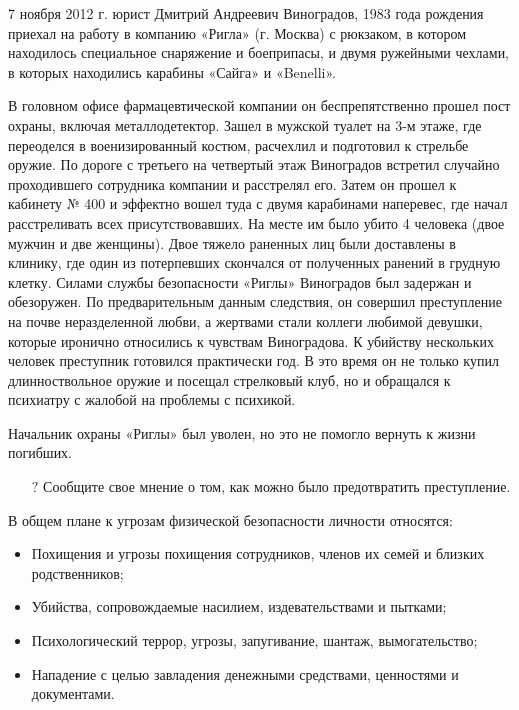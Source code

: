 \documentclass[a4paper,12pt,fleqn]{article} %
\begin{document}
\begin{tcolorbox}[colback=blue!55!red!5!,colframe=blue!55!red,enforce breakable,%
	pad at break=1mm, title=Кейс 28. Действия обиженного сотрудника]
	
7 ноября 2012 г. юрист Дмитрий Андреевич Виноградов, 1983 года рождения приехал на работу в компанию «Ригла» (г. Москва) с рюкзаком, в котором находилось специальное снаряжение и боеприпасы, и двумя ружейными чехлами, в которых находились карабины «Сайга» и «Benelli».

В головном офисе фармацевтической компании он беспрепятственно прошел пост охраны, включая металлодетектор. Зашел в мужской туалет на 3-м этаже, где переоделся в военизированный костюм, расчехлил и подготовил к стрельбе оружие. По дороге с третьего на четвертый этаж Виноградов встретил случайно проходившего сотрудника компании и расстрелял его. Затем он прошел к кабинету № 400 и эффектно вошел туда с двумя карабинами наперевес, где начал расстреливать всех присутствовавших. На месте им было убито 4 человека (двое мужчин и две женщины). Двое тяжело раненных лиц были доставлены в клинику, где один из потерпевших скончался от полученных ранений в грудную клетку. Силами службы безопасности «Риглы» Виноградов был задержан и обезоружен. По предварительным данным следствия, он совершил преступление на почве неразделенной любви, а жертвами стали коллеги любимой девушки, которые иронично относились к чувствам Виноградова. К убийству нескольких человек преступник готовился практически год. В это время он не только купил длинноствольное оружие и посещал стрелковый клуб, но и обращался к психиатру с жалобой на проблемы с психикой. 

Начальник охраны «Риглы» был уволен, но это не помогло вернуть к жизни погибших.

\begin{itemize}
	\item[{\color{blue!55!red}\Huge {  $ ? $}} \quad]   Сообщите свое мнение о том, как можно было предотвратить преступление.
\end{itemize}	
	
\end{tcolorbox}

В общем плане к угрозам физической безопасности личности относятся: 
\begin{itemize}
	\item Похищения и угрозы похищения сотрудников, членов их семей и близких родственников; 
	\item Убийства, сопровождаемые насилием, издевательствами и пытками; 
	\item Психологический террор, угрозы, запугивание, шантаж, вымогательство; 
	\item Нападение с целью завладения денежными средствами, ценностями и документами. 
\end{itemize}
\end{document}
